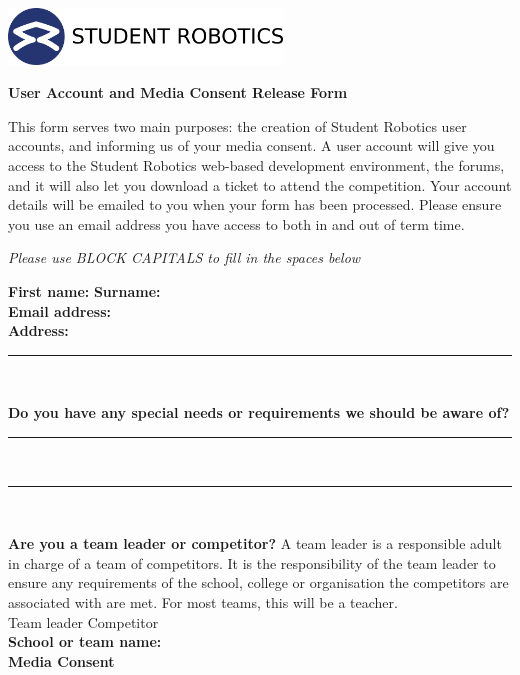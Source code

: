 \documentclass[a4paper,12pt]{article}
\newcommand{\checkbox}[1]{#1\hspace{0.2cm}\raisebox{-0.3mm}{$\square$}}
\newcommand{\textfield}[1]{\textbf{#1:} \hrulefill\hspace{0mm}}
\newcommand{\fieldsep}{\\[2.5mm]}
\newcommand{\textfieldline}{{\hrule\hspace{2mm}\fieldsep}}
\begin{document}
\begin{minipage}[c]{0.38\textwidth}
\includegraphics[height=1.5cm]{logo}
\end{minipage}
\hspace{0.12\textwidth}
\begin{minipage}[c]{0.48\textwidth}
\begin{center}
{\LARGE \textbf{User Account and Media Consent Release Form} \par}
\end{center}
\end{minipage}
\vspace{1cm}

This form serves two main purposes: the creation of Student Robotics user accounts, and informing us of your media consent.
A user account will give you access to the Student Robotics web-based development environment, the forums, and it will also let you download a ticket to attend the competition.
Your account details will be emailed to you when your form has been processed.
Please ensure you use an email address you have access to both in and out of term time.

\begin{center}
\textit{Please use BLOCK CAPITALS to fill in the spaces below}
\end{center}

\textfield{First name}  \textfield{Surname} \fieldsep
\textfield{Email address} \fieldsep
\textfield{Address} \fieldsep
\textfieldline

\textbf{Do you have any special needs or requirements we should be aware of?}
\fieldsep \textfieldline \textfieldline

\textbf{Are you a team leader or competitor?}
A team leader is a responsible adult in charge of a team of competitors.
It is the responsibility of the team leader to ensure any requirements of the school, college or organisation the competitors are associated with are met.
For most teams, this will be a teacher.\\[2mm]
\checkbox{Team leader} \hspace{1.5cm} \checkbox{Competitor} \\

\textfield{School or team name} \fieldsep


\textbf{\large Media Consent}\\\vspace{-3mm}
\end{document}
